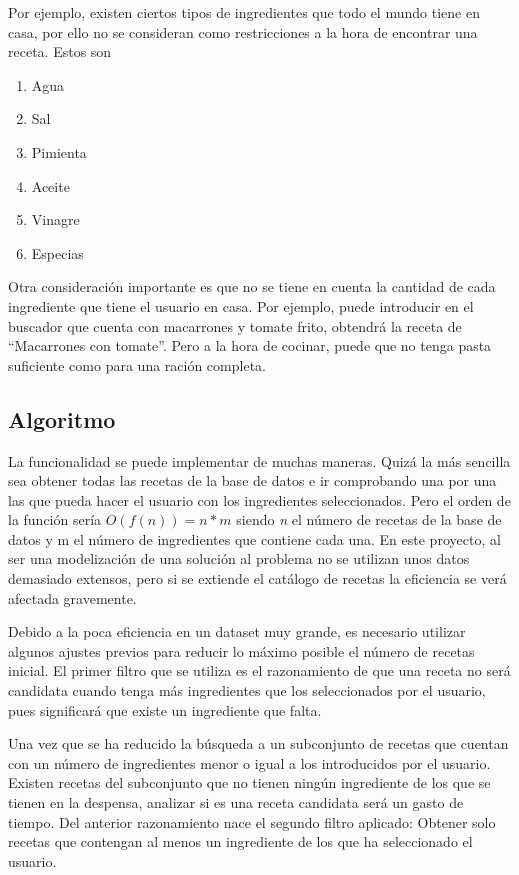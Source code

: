 Por ejemplo, existen ciertos tipos de ingredientes que todo el mundo tiene en casa, por ello no se consideran como restricciones a la hora de encontrar una receta. Estos son
\begin{enumerate}
    \item Agua
    \item Sal
    \item Pimienta
    \item Aceite
    \item Vinagre
    \item Especias
\end{enumerate}

Otra consideración importante es que no se tiene en cuenta la cantidad de cada ingrediente que tiene el usuario en casa. Por ejemplo, puede introducir en el buscador que cuenta con macarrones y tomate frito, obtendrá la receta de ``Macarrones con tomate''. Pero a la hora de cocinar, puede que no tenga pasta suficiente como para una ración completa.

\subsection{Algoritmo}
La funcionalidad se puede implementar de muchas maneras. Quizá la más sencilla sea obtener todas las recetas de la base de datos e ir comprobando una por una las que pueda hacer el usuario con los ingredientes seleccionados. Pero el orden de la función sería  $O(f(n))=n*m$ siendo \textit{n} el número de recetas de la base de datos y m el número de ingredientes que contiene cada una. En este proyecto, al ser una modelización de una solución al problema no se utilizan unos datos demasiado extensos, pero si se extiende el catálogo de recetas la eficiencia se verá afectada gravemente.

Debido a la poca eficiencia en un \gls{dataset} muy grande, es necesario utilizar algunos ajustes previos para reducir lo máximo posible el número de recetas inicial. El primer filtro que se utiliza es el razonamiento de que una receta no será candidata cuando tenga más ingredientes que los seleccionados por el usuario, pues significará que existe un ingrediente que falta. 

Una vez que se ha reducido la búsqueda a un subconjunto de recetas que cuentan con un número de ingredientes menor o igual a los introducidos por el usuario. Existen recetas del subconjunto que no tienen ningún ingrediente de los que se tienen en la despensa, analizar si es una receta candidata será un gasto de tiempo. Del anterior razonamiento nace el segundo filtro aplicado: Obtener solo recetas que contengan al menos un ingrediente de los que ha seleccionado el usuario. 


